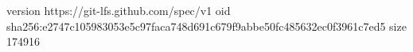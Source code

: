 version https://git-lfs.github.com/spec/v1
oid sha256:e2747c105983053e5c97faca748d691c679f9abbe50fc485632ec0f3961c7ed5
size 174916
